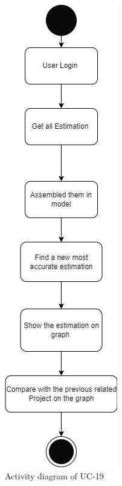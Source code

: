 \begin{figure}[H]
    \centering
    \includegraphics[scale=0.5]{./diagrams/Activity Diagram/ad-19.png}
    \caption{Activity diagram of UC-19}
    \label{fig:act-19}

\end{figure}


